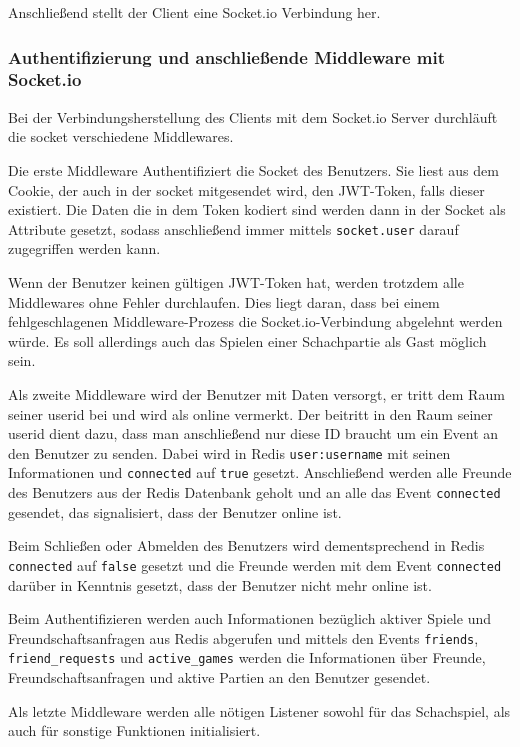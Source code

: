 Anschließend stellt der Client eine Socket.io Verbindung her.

\subsubsection{Authentifizierung und anschließende Middleware mit Socket.io}
\label{sec:socketauth}
Bei der Verbindungsherstellung des Clients mit dem Socket.io Server durchläuft die socket verschiedene Middlewares.

Die erste Middleware Authentifiziert die Socket des Benutzers. Sie liest aus dem Cookie, der auch in der socket mitgesendet wird, den JWT-Token, falls dieser existiert. Die Daten die in dem Token kodiert sind werden dann in der Socket als Attribute gesetzt, sodass anschließend immer mittels \verb|socket.user| darauf zugegriffen werden kann.

Wenn der Benutzer keinen gültigen JWT-Token hat, werden trotzdem alle Middlewares ohne Fehler durchlaufen. Dies liegt daran, dass bei einem fehlgeschlagenen Middleware-Prozess die Socket.io-Verbindung abgelehnt werden würde. Es soll allerdings auch das Spielen einer Schachpartie als Gast möglich sein.

Als zweite Middleware wird der Benutzer mit Daten versorgt, er tritt dem Raum seiner userid bei und wird als online vermerkt.
Der beitritt in den Raum seiner userid dient dazu, dass man anschließend nur diese ID braucht um ein Event an den Benutzer zu senden. Dabei wird in Redis \verb|user:username| mit seinen Informationen und \verb|connected| auf \verb|true| gesetzt. Anschließend werden alle Freunde des Benutzers aus der Redis Datenbank geholt und an alle das Event \verb|connected| gesendet, das signalisiert, dass der Benutzer online ist.

Beim Schließen oder Abmelden des Benutzers wird dementsprechend in Redis \verb|connected| auf \verb|false| gesetzt und die Freunde werden mit dem Event \verb|connected| darüber in Kenntnis gesetzt, dass der Benutzer nicht mehr online ist.

Beim Authentifizieren werden auch Informationen bezüglich aktiver Spiele und Freundschaftsanfragen aus Redis abgerufen und mittels den Events \verb|friends|, \verb|friend_requests| und \verb|active_games| werden die Informationen über Freunde, Freundschaftsanfragen und aktive Partien an den Benutzer gesendet.

Als letzte Middleware werden alle nötigen Listener sowohl für das Schachspiel, als auch für sonstige Funktionen initialisiert.

